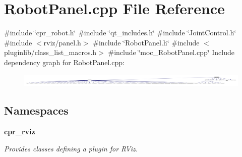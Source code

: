 \section{Robot\+Panel.\+cpp File Reference}
\label{RobotPanel_8cpp}
{\ttfamily \#include \char`\"{}cpr\+\_\+robot.\+h\char`\"{}}\newline
{\ttfamily \#include \char`\"{}qt\+\_\+includes.\+h\char`\"{}}\newline
{\ttfamily \#include \char`\"{}Joint\+Control.\+h\char`\"{}}\newline
{\ttfamily \#include $<$rviz/panel.\+h$>$}\newline
{\ttfamily \#include \char`\"{}Robot\+Panel.\+h\char`\"{}}\newline
{\ttfamily \#include $<$pluginlib/class\+\_\+list\+\_\+macros.\+h$>$}\newline
{\ttfamily \#include \char`\"{}moc\+\_\+\+Robot\+Panel.\+cpp\char`\"{}}\newline
Include dependency graph for Robot\+Panel.\+cpp\+:
\nopagebreak
\begin{figure}[H]
\begin{center}
\leavevmode
\includegraphics[width=350pt]{RobotPanel_8cpp__incl}
\end{center}
\end{figure}
\subsection*{Namespaces}
\begin{DoxyCompactItemize}
\item 
 \textbf{ cpr\+\_\+rviz}
\begin{DoxyCompactList}\small\item\em Provides classes defining a plugin for R\+Viz. \end{DoxyCompactList}\end{DoxyCompactItemize}
